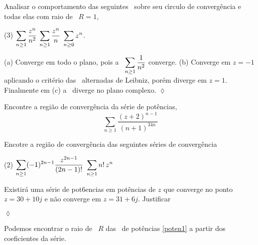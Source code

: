 \begin{exer}
Analisar o comportamento das seguintes \sers\ sobre seu c\'{\i}rculo de
converg\^{e}ncia e todas elas com raio de \conver\ $R=1$,
\begin{tasks}[label=(\alph*),label-width=2em,item-indent=4em,ref=(\alph*)](3)
 \task $\displaystyle{\sum_{n\geq 1}\frac{z^n}{n^2}}$
 \task $\displaystyle{\sum_{n\geq 1}\frac{z^n}{n}}$
\task $\displaystyle{\sum_{n\geq 0}z^n}$.
\end{tasks}
\end{exer}

\solo
(a) Converge em todo o plano, pois a \ser\ $\displaystyle{\sum_{n\geq 1}\frac{1}{n^2}}$
  converge. (b) Converge em $z=-1$ aplicando o crit\'erio das \sers\ alternadas de Leibniz, por\'em
  diverge em $z=1$. Finalmente em (c) a \ser\ diverge no plano complexo.
\hfill \(\lozenge\)

\begin{exer}
Encontre a regi\~{a}o de converg\^{e}ncia da s\'{e}rie de pot\^{e}ncias,
\begin{equation*}
    \sum_{n\ge 1}\frac{(z+2)^{n-1}}{(n+1)^{34n}}
\end{equation*}
\end{exer}

\solo

\begin{exer}
Encotre a regi\~{a}o de converg\^{e}ncia das seguintes s\'{e}ries de
converg\^{e}ncia
\begin{tasks}[label=(\alph*),item-indent=5em,label-width=4ex,ref=(\alph*)](2)
\task  \(\displaystyle \sum_{n\ge 1}(-1)^{2n-1}\frac{z^{2n-1}}{(2n-1)!}\)
\task  \(\displaystyle \sum_{n\ge 1}n!\,z^{n}\)
\end{tasks}
\end{exer}

\solo

\begin{exer}
Existir\'{a} uma s\'{e}rie de pot6encias em pot\^{e}ncias de $z$ que converge no
ponto $z=30+10j$ e n\~{a}o converge em $z=31+6j$. Justificar
\end{exer}

\solo
\hfill \(\lozenge\)


Podemos encontrar o raio de \conver\ $R$ das \sers\ de pot\^{e}ncias
\eqref{poten1} a partir dos coeficientes da s\'{e}rie.

